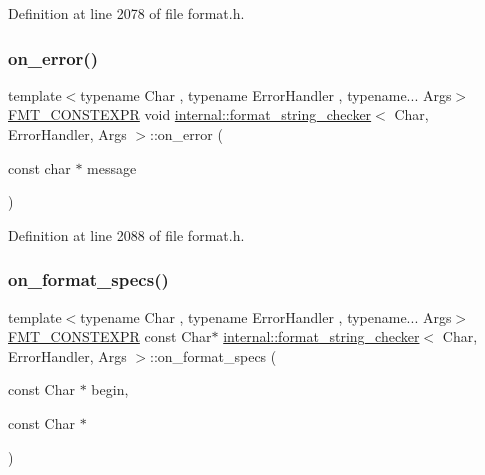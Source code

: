 Definition at line 2078 of file format.\+h.

\mbox{\label{classinternal_1_1format__string__checker_a4436018134529c7b630b05bef2342b89}} 
\subsubsection{\texorpdfstring{on\+\_\+error()}{on\_error()}}
{\footnotesize\ttfamily template$<$typename Char , typename Error\+Handler , typename... Args$>$ \\
\hyperlink{core_8h_a69201cb276383873487bf68b4ef8b4cd}{F\+M\+T\+\_\+\+C\+O\+N\+S\+T\+E\+X\+PR} void \hyperlink{classinternal_1_1format__string__checker}{internal\+::format\+\_\+string\+\_\+checker}$<$ Char, Error\+Handler, Args $>$\+::on\+\_\+error (\begin{DoxyParamCaption}\item[{const char $\ast$}]{message }\end{DoxyParamCaption})\hspace{0.3cm}{\ttfamily [inline]}}



Definition at line 2088 of file format.\+h.

\mbox{\label{classinternal_1_1format__string__checker_ab58cc5258709ff65992f15b42eb53259}} 
\subsubsection{\texorpdfstring{on\+\_\+format\+\_\+specs()}{on\_format\_specs()}}
{\footnotesize\ttfamily template$<$typename Char , typename Error\+Handler , typename... Args$>$ \\
\hyperlink{core_8h_a69201cb276383873487bf68b4ef8b4cd}{F\+M\+T\+\_\+\+C\+O\+N\+S\+T\+E\+X\+PR} const Char$\ast$ \hyperlink{classinternal_1_1format__string__checker}{internal\+::format\+\_\+string\+\_\+checker}$<$ Char, Error\+Handler, Args $>$\+::on\+\_\+format\+\_\+specs (\begin{DoxyParamCaption}\item[{const Char $\ast$}]{begin,  }\item[{const Char $\ast$}]{ }\end{DoxyParamCaption})\hspace{0.3cm}{\ttfamily [inline]}}



